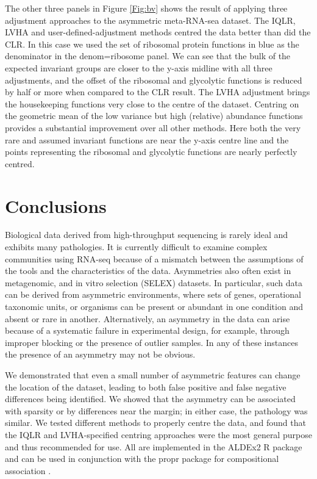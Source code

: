 \documentclass{bmcart}
\begin{document}

The other three panels in Figure \ref{Fig:bv} shows the result of applying  three adjustment approaches to the asymmetric meta-RNA-sea dataset. The IQLR, LVHA and user-defined-adjustment methods centred the data  better than did the CLR. In this case we used the set of ribosomal protein functions in blue as the denominator in the denom=ribosome panel. We can see that the bulk of the expected invariant groups are closer to the y-axis midline with all three adjustments, and the offset of the ribosomal and glycolytic functions is reduced by half or more when compared to the CLR result. The LVHA adjustment brings the housekeeping functions very close to the centre of the dataset.  Centring on the geometric mean of the low variance but high (relative) abundance functions provides a substantial improvement over all other methods. Here both the very rare and assumed invariant functions are near the y-axis centre line and the points representing the ribosomal and glycolytic functions are nearly perfectly centred.

\section*{Conclusions}


Biological data derived from high-throughput sequencing is rarely ideal and exhibits many pathologies. It is currently difficult to examine complex communities using RNA-seq because of a mismatch between the assumptions of the tools and the characteristics of the data. Asymmetries also often exist in metagenomic, and in vitro selection (SELEX) datasets. In particular, such data can be derived from asymmetric environments, where sets of genes, operational taxonomic units, or organisms can be present or abundant in one condition and absent or rare in another. Alternatively, an asymmetry in the data can arise because of a systematic failure in experimental design, for example, through improper blocking or the presence of outlier samples. In any of these instances the presence of an asymmetry may not be obvious. 

We demonstrated that even a small number of asymmetric features can change the location of the dataset, leading to both false positive and false negative differences being identified. We showed that the asymmetry can be associated with sparsity or by differences near the margin; in either case, the pathology was similar. We tested  different methods to properly centre the data, and found that the IQLR and LVHA-specified centring approaches were the most general purpose and thus recommended for use. All are implemented in the ALDEx2 R package and can be used in conjunction with the propr package for compositional association \cite{Quinn:2017}. 
\end{document}

